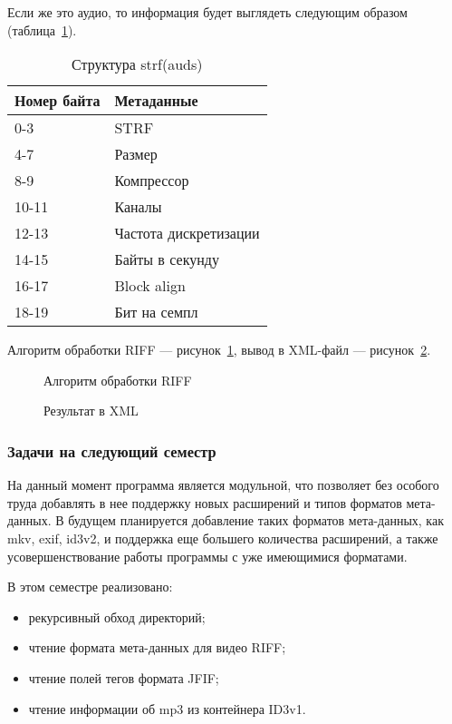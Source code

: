 Если же это аудио, то информация будет выглядеть следующим образом (таблица~\ref{tab:auds}).

\begin{table}[ht]
\caption{Структура strf(auds)}
\label{tab:auds}
\begin{center}
\begin{tabularx}{\linewidth}{|l|X|}
\hline
Номер байта & Метаданные \\
\hline
0-3 & STRF \\
\hline
4-7 & Размер \\
\hline
8-9 & Компрессор \\
\hline
10-11 & Каналы \\
\hline
12-13 & Частота дискретизации \\
\hline
14-15 & Байты в секунду \\
\hline
16-17 & Block align \\
\hline
18-19 & Бит на семпл \\
\hline
\end{tabularx}
\end{center}
\end{table}

Алгоритм обработки RIFF --- рисунок~\ref{bokov_5:bokov_5}, вывод в XML-файл --- рисунок~\ref{bokov_6:bokov_6}. 

\begin{figure}[h!]
\caption{Алгоритм обработки RIFF}
\label{bokov_5:bokov_5}
\end{figure} 

\begin{figure}[h!]
\caption{Результат в XML}
\label{bokov_6:bokov_6}
\end{figure}

\subsubsection{Задачи на следующий семестр}

На данный момент программа является модульной, что позволяет без особого труда добавлять в нее поддержку новых расширений и типов форматов мета-данных. В будущем планируется добавление таких форматов мета-данных, как mkv, exif, id3v2, и поддержка еще большего количества расширений, а также усовершенствование работы программы с уже имеющимися форматами.

В этом семестре реализовано:

\begin{itemize}
  \item рекурсивный обход директорий;
  \item чтение формата мета-данных для видео RIFF;
  \item чтение полей тегов формата JFIF;
  \item чтение информации об mp3 из контейнера ID3v1.
\end{itemize}

\clearpage
